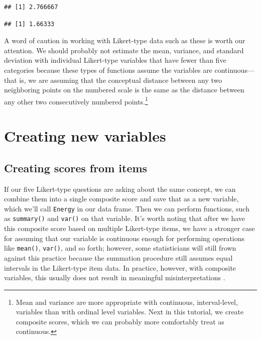 \documentclass[
]{book}
\newenvironment{Shaded}{\begin{snugshade}}{\end{snugshade}}
\newcommand{\KeywordTok}[1]{\textcolor[rgb]{0.13,0.29,0.53}{\textbf{#1}}}
\newcommand{\NormalTok}[1]{#1}
\newcommand{\OperatorTok}[1]{\textcolor[rgb]{0.81,0.36,0.00}{\textbf{#1}}}
\begin{document}
\begin{verbatim}
## [1] 2.766667
\end{verbatim}

\begin{Shaded}
\end{Shaded}

\begin{verbatim}
## [1] 1.66333
\end{verbatim}

A word of caution in working with Likert-type data such as these is worth our attention. We should probably not estimate the mean, variance, and standard deviation with individual Likert-type variables that have fewer than five categories because these types of functions assume the variables are continuous---that is, we are assuming that the conceptual distance between any two neighboring points on the numbered scale is the same as the distance between any other two consecutively numbered points.\footnote{Mean and variance are more appropriate with continuous, interval-level, variables than with ordinal level variables. Next in this tutorial, we create composite scores, which we can probably more comfortably treat as continuous.}

\hypertarget{appending}{%
\chapter{Creating new variables}\label{appending}}

\hypertarget{creating-scores-from-items}{%
\section{Creating scores from items}\label{creating-scores-from-items}}

If our five Likert-type questions are asking about the same concept, we can combine them into a single composite score and save that as a new variable, which we'll call \texttt{Energy} in our data frame. Then we can perform functions, such as \texttt{summary()} and \texttt{var()} on that variable. It's worth noting that after we have this composite score based on multiple Likert-type items, we have a stronger case for assuming that our variable is continuous enough for performing operations like \texttt{mean()}, \texttt{var()}, and so forth; however, some statisticians will still frown against this practice because the summation procedure still assumes equal intervals in the Likert-type item data. In practice, however, with composite variables, this usually does not result in meaningful misinterpretations \citep{carifio_resolving_2008, norman_likert_2010}.
\end{document}

